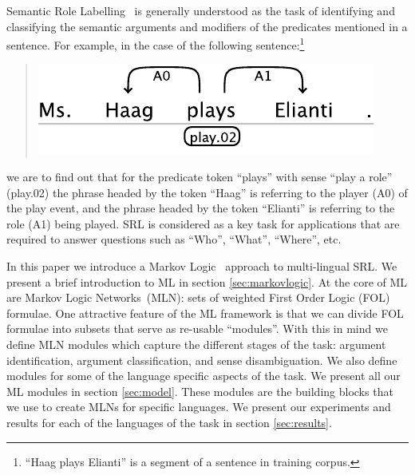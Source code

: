 
Semantic Role Labelling~\citep[SRL, ][]{marquez08srl} is generally understood as 
the task of identifying and classifying the semantic arguments and modifiers of 
the predicates mentioned in a sentence. For example, in the case of the 
following sentence:\footnote{``Haag plays Elianti'' is a segment of a sentence in 
training corpus.}
\begin{quote}
\begin{center}
    \includegraphics[scale=.63]{haag-example}
\end{center}
\end{quote}
we are to find out that for the predicate token {}``plays'' with sense ``play a 
role'' (play.02) the phrase headed by the token {}``Haag'' is referring to the 
player (A0) of the play event, and the phrase headed by the token {}``Elianti''  
is referring to the role (A1) being played. SRL is considered as a key task for 
applications that are required to answer questions such as {}``Who'', {}``What'', {}``Where'', etc.  

In this paper we introduce a Markov Logic~\citep[ML,][]{richardson06mln} approach to multi-lingual
SRL. We present a brief introduction to ML in 
section \ref{sec:markovlogic}.  At the core of ML are Markov Logic Networks~(MLN): sets of weighted First Order 
Logic (FOL) formulae. One attractive feature of the ML 
framework is that we can divide FOL formulae into subsets that serve as re-usable ``modules''. 
With this in mind we define MLN modules which capture the different stages of 
the task: argument identification, argument classification, and sense 
disambiguation. We also define modules for some of the language specific aspects of 
the task. We present all our ML modules in section 
\ref{sec:model}. These modules are the building blocks that we use to create 
MLNs for specific languages. We present our experiments and results for each of 
the languages of the task in section \ref{sec:results}.


